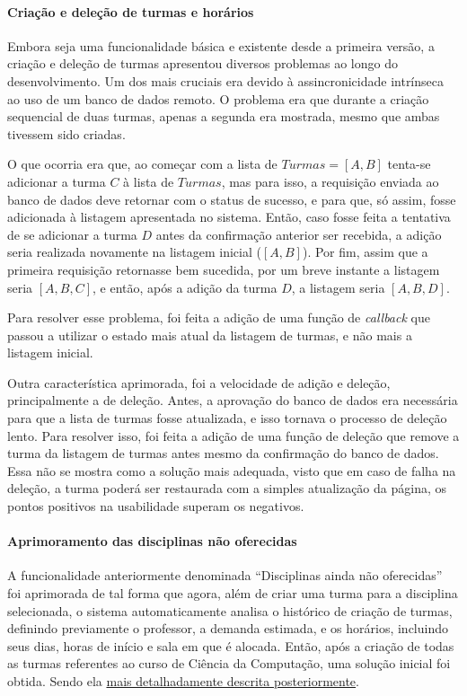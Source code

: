 \paragraph*{Criação e deleção de turmas e horários}

Embora seja uma funcionalidade básica e existente desde a primeira versão, a criação e deleção de turmas apresentou diversos problemas ao longo do desenvolvimento. Um dos mais cruciais era devido à assincronicidade intrínseca ao uso de um banco de dados remoto. O problema era que durante a criação sequencial de duas turmas, apenas a segunda era mostrada, mesmo que ambas tivessem sido criadas.

O que ocorria era que, ao começar com a lista de $Turmas = [A, B]$ tenta-se adicionar a turma $C$ à lista de $Turmas$, mas para isso, a requisição enviada ao banco de dados deve retornar com o status de sucesso, e para que, só assim, fosse adicionada à listagem apresentada no sistema. Então, caso fosse feita a tentativa de se adicionar a turma $D$ antes da confirmação anterior ser recebida, a adição seria realizada novamente na listagem inicial ($[A, B]$). Por fim, assim que a primeira requisição retornasse bem sucedida, por um breve instante a listagem seria $[A, B, C]$, e então, após a adição da turma $D$, a listagem seria $[A, B, D]$.

Para resolver esse problema, foi feita a adição de uma função de \textit{callback} que passou a utilizar o estado mais atual da listagem de turmas, e não mais a listagem inicial.

Outra característica aprimorada, foi a velocidade de adição e deleção, principalmente a de deleção. Antes, a aprovação do banco de dados era necessária para que a lista de turmas fosse atualizada, e isso tornava o processo de deleção lento. Para resolver isso, foi feita a adição de uma função de deleção que remove a turma da listagem de turmas antes mesmo da confirmação do banco de dados. Essa não se mostra como a solução mais adequada, visto que em caso de falha na deleção, a turma poderá ser restaurada com a simples atualização da página, os pontos positivos na usabilidade superam os negativos.

\paragraph*{Aprimoramento das disciplinas não oferecidas} \label{par:Solução inicial}

A funcionalidade anteriormente denominada ``Disciplinas ainda não oferecidas'' foi aprimorada de tal forma que agora, além de criar uma turma para a disciplina selecionada, o sistema automaticamente analisa o histórico de criação de turmas, definindo previamente o professor, a demanda estimada, e os horários, incluindo seus dias, horas de início e sala em que é alocada. Então, após a criação de todas as turmas referentes ao curso de Ciência da Computação, uma solução inicial foi obtida. Sendo ela \hyperref[sec:Solução inicial]{mais detalhadamente descrita posteriormente}.

